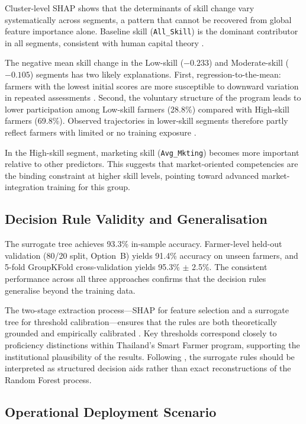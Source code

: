 \documentclass[3p,twocolumn,authoryear]{elsarticle}
\begin{document}
Cluster-level SHAP shows that the determinants of skill change vary
systematically across segments, a pattern that cannot be recovered from global
feature importance alone. Baseline skill (\texttt{All\_Skill}) is the dominant
contributor in all segments, consistent with human capital theory
\citep{feder1985,davis2012}.

The negative mean skill change in the Low-skill ($-0.233$) and Moderate-skill
($-0.105$) segments has two likely explanations. First, regression-to-the-mean:
farmers with the lowest initial scores are more susceptible to downward
variation in repeated assessments \citep{davis2012}. Second, the voluntary
structure of the program leads to lower participation among Low-skill farmers
(28.8\%) compared with High-skill farmers (69.8\%). Observed trajectories in
lower-skill segments therefore partly reflect farmers with limited or no
training exposure \citep{anderson2004}.

In the High-skill segment, marketing skill (\texttt{Avg\_Mkting}) becomes more
important relative to other predictors. This suggests that market-oriented
competencies are the binding constraint at higher skill levels, pointing toward
advanced market-integration training for this group.

\subsection{Decision Rule Validity and Generalisation}

The surrogate tree achieves 93.3\% in-sample accuracy. Farmer-level held-out
validation (80/20 split, Option~B) yields 91.4\% accuracy on unseen farmers, and
5-fold GroupKFold cross-validation yields 95.3\% $\pm$ 2.5\%. The consistent
performance across all three approaches confirms that the decision rules
generalise beyond the training data.

The two-stage extraction process—SHAP for feature selection and a surrogate tree
for threshold calibration—ensures that the rules are both theoretically grounded
and empirically calibrated \citep{molnar2022}. Key thresholds correspond closely
to proficiency distinctions within Thailand’s Smart Farmer program, supporting
the institutional plausibility of the results. Following \citet{rudin2019}, the
surrogate rules should be interpreted as structured decision aids rather than
exact reconstructions of the Random Forest process.

\subsection{Operational Deployment Scenario}
\end{document}
